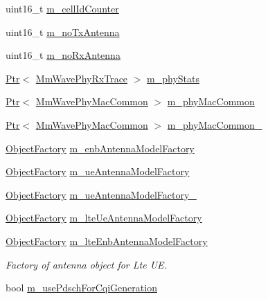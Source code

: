 \begin{DoxyCompactItemize}
uint16\+\_\+t \hyperlink{classns3_1_1MmWaveHelper_a8386109fad3e913312ba2833c0116ea8}{m\+\_\+cell\+Id\+Counter}
\item 
uint16\+\_\+t \hyperlink{classns3_1_1MmWaveHelper_ad88599b0380c87427187dd5ed61f0d4b}{m\+\_\+no\+Tx\+Antenna}
\item 
uint16\+\_\+t \hyperlink{classns3_1_1MmWaveHelper_a2830b26fda8f11334d1d0291a3c110f7}{m\+\_\+no\+Rx\+Antenna}
\item 
\hyperlink{classns3_1_1Ptr}{Ptr}$<$ \hyperlink{classns3_1_1MmWavePhyRxTrace}{Mm\+Wave\+Phy\+Rx\+Trace} $>$ \hyperlink{classns3_1_1MmWaveHelper_ab9d839b6818e194a54630facc19cbb1a}{m\+\_\+phy\+Stats}
\item 
\hyperlink{classns3_1_1Ptr}{Ptr}$<$ \hyperlink{classns3_1_1MmWavePhyMacCommon}{Mm\+Wave\+Phy\+Mac\+Common} $>$ \hyperlink{classns3_1_1MmWaveHelper_a6aaa35de743b9a88998de0128b1046b4}{m\+\_\+phy\+Mac\+Common}
\item 
\hyperlink{classns3_1_1Ptr}{Ptr}$<$ \hyperlink{classns3_1_1MmWavePhyMacCommon}{Mm\+Wave\+Phy\+Mac\+Common} $>$ \hyperlink{classns3_1_1MmWaveHelper_ab4e9d2f9a49a485dadb3404e8c196f4c}{m\+\_\+phy\+Mac\+Common\+\_}
\item 
\hyperlink{classns3_1_1ObjectFactory}{Object\+Factory} \hyperlink{classns3_1_1MmWaveHelper_a840991b3233061820c1a85a403510388}{m\+\_\+enb\+Antenna\+Model\+Factory}
\item 
\hyperlink{classns3_1_1ObjectFactory}{Object\+Factory} \hyperlink{classns3_1_1MmWaveHelper_a8b7460b8578a56bb15f191983959b3ac}{m\+\_\+ue\+Antenna\+Model\+Factory}
\item 
\hyperlink{classns3_1_1ObjectFactory}{Object\+Factory} \hyperlink{classns3_1_1MmWaveHelper_a7ef08ce5370273c01f60d8c805841af1}{m\+\_\+ue\+Antenna\+Model\+Factory\+\_}
\item 
\hyperlink{classns3_1_1ObjectFactory}{Object\+Factory} \hyperlink{classns3_1_1MmWaveHelper_a543a845c12b4efc740350488d5eb6814}{m\+\_\+lte\+Ue\+Antenna\+Model\+Factory}
\item 
\hyperlink{classns3_1_1ObjectFactory}{Object\+Factory} \hyperlink{classns3_1_1MmWaveHelper_a1548fc8f90466b690f5cbbe5cd19ff34}{m\+\_\+lte\+Enb\+Antenna\+Model\+Factory}
\begin{DoxyCompactList}\small\item\em Factory of antenna object for Lte UE. \end{DoxyCompactList}\item 
bool \hyperlink{classns3_1_1MmWaveHelper_aa22c5cc230f1e0e6bfd280ed2b6f9635}{m\+\_\+use\+Pdsch\+For\+Cqi\+Generation}

\end{DoxyCompactItemize}
